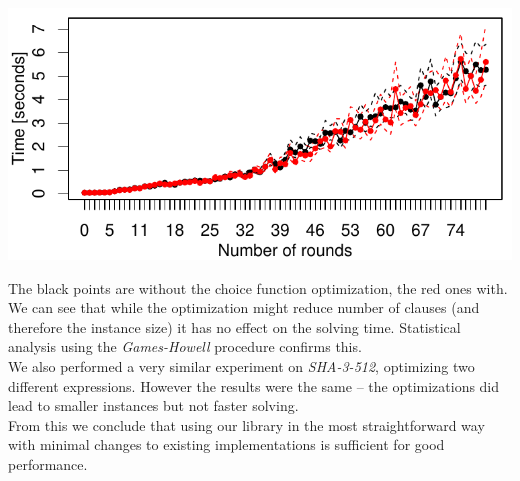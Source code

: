\documentclass[myposter,portrait]{sciposter}
\def\mysection#1{
{\color{sectionCol}\section*{\sc\bfseries #1}}}
\begin{document}
\begin{multicols*}{3}
\includegraphics[width=\columnwidth]{figures/opt-sha1/sha1-32bit-8bitref-cmp-espresso-sq-lin.pdf}

The black points are without the choice function optimization, the red ones with.
We can see that while the optimization might reduce number of clauses (and therefore the instance size) it has no effect on the solving time.
Statistical analysis using the \emph{Games-Howell} procedure \cite{games1976pairwise} confirms this.
~\\

We also performed a very similar experiment on \emph{SHA-3-512}, optimizing two different expressions.
However the results were the same -- the optimizations did lead to smaller instances but not faster solving.
~\\

From this we conclude that using our library in the most straightforward way with minimal changes to existing implementations is sufficient for good performance.







\end{multicols*}
\end{document}
